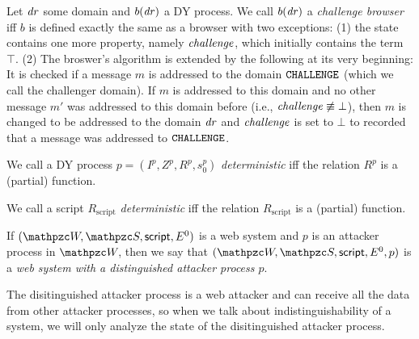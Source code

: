   \begin{definition}
    Let $\mathit{dr}$ some domain and $b(\mathit{dr})$ a DY process. 
    We call $b(\mathit{dr})$ a \emph{challenge browser} iff $b$
    is defined exactly the same as a browser with two exceptions: 
    (1) the state contains one more property, namely 
    $\mathit{challenge}$, which initially contains the term $\top$. 
    (2) The broswer's algorithm is extended by the following at 
    its very beginning: It is checked if a message $m$ is 
    addressed to the domain $\mathtt{CHALLENGE}$ (which we call the 
    challenger domain). If $m$ is addressed to this domain and 
    no other message $m'$ was addressed to this domain before 
    (i.e., $\mathit{challenge} \not\equiv \bot$), then $m$ is changed 
    to be addressed to the domain $\mathit{dr}$ and $\mathit{challenge}$ 
    is set to $\bot$ to recorded that a message was addressed to 
    $\mathtt{CHALLENGE}$.
  \end{definition}
  
  \begin{definition}
    We call a DY process $p = (I^p,Z^p,R^p,s_0^p)$ \emph{deterministic} iff 
    the relation $R^p$ is a (partial) function.
  
    We call a script $R_\text{script}$ \emph{deterministic} iff the relation 
    $R_\text{script}$ is a (partial) function.
  \end{definition}

  \begin{definition}
    If $(\websystem, \scriptset,\mathsf{script}, E^0)$ is
    a web system and $p$ is an attacker process in
    $\websystem$, then we say that $(\websystem,
    \scriptset,\mathsf{script}, E^0,p)$ is a \emph{web
    system with a distinguished attacker process $p$}. 
  \end{definition}

  The disitinguished attacker process is a web attacker and 
  can receive all the data from other attacker processes, 
  so when we talk about indistinguishability of a system, 
  we will only analyze the state of the disitinguished attacker process.
  
